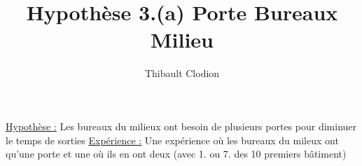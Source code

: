 \documentclass[12pt]{article}
\title{Hypothèse 3.(a) Porte Bureaux Milieu}
\author{Thibault Clodion}
\begin{document}
\maketitle %

\underline{Hypothèse :} Les bureaux du milieux ont besoin de plusieurs portes pour diminuer le temps de sorties
\newline\newline
\underline{Expérience :} Une expérience où les bureaux du mileux ont qu'une porte et une où ils en ont deux (avec 1. ou 7. des 10 premiers bâtiment)
\newline\newline
\end{document}
